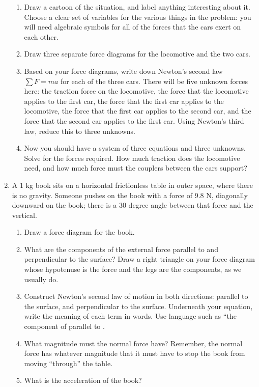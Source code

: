 \documentclass[12pt]{article}
\begin{document}
\begin{enumerate}
\begin{enumerate}
\item Draw a cartoon of the situation, and label anything interesting about it. Choose a clear set of variables for the various things in the problem: you will need algebraic symbols for all of the forces that the cars exert on each other.
\item Draw three separate force diagrams for the locomotive and the two cars.
\item Based on your force diagrams, write down Newton's second law $\sum F = ma$ for each of the three cars. There will be five unknown forces here: the traction force on the locomotive, the force that the locomotive applies to the first car,
the force that the first car applies to the locomotive, the force that the first car applies to the second car, and the force that the second car applies to the first car. Using Newton's third law, reduce this to three unknowns.
\item Now you should have a system of three equations and three unknowns. Solve for the forces required. How much 
traction does the locomotive need, and how much force must the couplers between the cars support?
\end{enumerate} 

\item{A 1 kg book sits on a horizontal frictionless table in outer space, where there is no
 	gravity. Someone pushes on the book with a force of 9.8 N, diagonally downward on the book; there is a 30 degree
 	angle between that force and the vertical.}

 	\begin{enumerate}
\item{Draw a force diagram for the book. }
\item{What are the components of the external force parallel to and perpendicular to
 	the surface? Draw a right triangle on your force diagram whose hypotenuse is the
 	force and the legs are the components, as we usually do.}
\item Construct Newton's second law of motion in both directions: parallel to the surface, and perpendicular to the surface. 
Underneath your equation, write the meaning of each term in words. Use language such as ``the component of \underline{\hspace{0.5in}} parallel to \underline{\hspace{0.5in}}.


\item{What magnitude must the normal force have? Remember, the normal force has
 	whatever magnitude that it must have to stop the book from moving ``through''
 	the table.}
\item{What is the acceleration of the book?}
\end{enumerate}


\end{enumerate}
\end{document}
